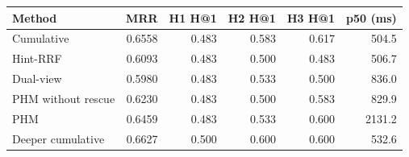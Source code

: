 \begin{tabular}{lrrrrr}
\hline
Method & MRR & H1 H@1 & H2 H@1 & H3 H@1 & p50 (ms) \\
\hline
Cumulative & 0.6558 & 0.483 & 0.583 & 0.617 & 504.5 \\
Hint-RRF & 0.6093 & 0.483 & 0.500 & 0.483 & 506.7 \\
Dual-view & 0.5980 & 0.483 & 0.533 & 0.500 & 836.0 \\
PHM without rescue & 0.6230 & 0.483 & 0.500 & 0.583 & 829.9 \\
PHM & 0.6459 & 0.483 & 0.533 & 0.600 & 2131.2 \\
Deeper cumulative & 0.6627 & 0.500 & 0.600 & 0.600 & 532.6 \\
\hline
\end{tabular}
